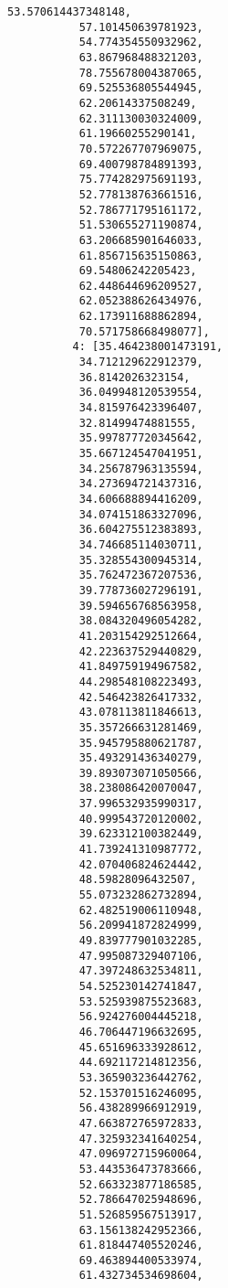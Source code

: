 \documentclass[11pt]{article}
\begin{document}
\begin{Verbatim}[commandchars=\\\{\}]
           53.570614437348148,
           57.101450639781923,
           54.774354550932962,
           63.867968488321203,
           78.755678004387065,
           69.525536805544945,
           62.20614337508249,
           62.311130030324009,
           61.19660255290141,
           70.572267707969075,
           69.400798784891393,
           75.774282975691193,
           52.778138763661516,
           52.786771795161172,
           51.530655271190874,
           63.206685901646033,
           61.856715635150863,
           69.54806242205423,
           62.448644696209527,
           62.052388626434976,
           62.173911688862894,
           70.571758668498077],
          4: [35.464238001473191,
           34.712129622912379,
           36.8142026323154,
           36.049948120539554,
           34.815976423396407,
           32.81499474881555,
           35.997877720345642,
           35.667124547041951,
           34.256787963135594,
           34.273694721437316,
           34.606688894416209,
           34.074151863327096,
           36.604275512383893,
           34.746685114030711,
           35.328554300945314,
           35.762472367207536,
           39.778736027296191,
           39.594656768563958,
           38.084320496054282,
           41.203154292512664,
           42.223637529440829,
           41.849759194967582,
           44.298548108223493,
           42.546423826417332,
           43.078113811846613,
           35.357266631281469,
           35.945795880621787,
           35.493291436340279,
           39.893073071050566,
           38.238086420070047,
           37.996532935990317,
           40.999543720120002,
           39.623312100382449,
           41.739241310987772,
           42.070406824624442,
           48.59828096432507,
           55.073232862732894,
           62.482519006110948,
           56.209941872824999,
           49.839777901032285,
           47.995087329407106,
           47.397248632534811,
           54.525230142741847,
           53.525939875523683,
           56.924276004445218,
           46.706447196632695,
           45.651696333928612,
           44.692117214812356,
           53.365903236442762,
           52.153701516246095,
           56.438289966912919,
           47.663872765972833,
           47.325932341640254,
           47.096972715960064,
           53.443536473783666,
           52.663323877186585,
           52.786647025948696,
           51.526859567513917,
           63.156138242952366,
           61.818447405520246,
           69.463894400533974,
           61.432734534698604,

\end{Verbatim}
\end{document}
